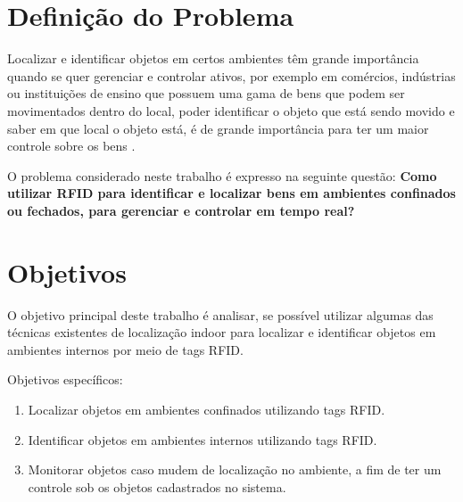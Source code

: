 \section{Definição do Problema}

Localizar e identificar objetos em certos ambientes têm grande importância quando se quer gerenciar e controlar ativos, por exemplo em comércios, indústrias ou instituições de ensino que possuem uma gama de bens que podem ser movimentados dentro do local,  poder identificar o objeto que está sendo movido e saber em que local o objeto está, é de grande importância para ter um maior controle sobre os bens \cite{realtimeRFID2016}. 

\par
O problema considerado neste trabalho é expresso na seguinte questão: \textbf{ Como utilizar RFID para identificar e localizar bens em ambientes confinados ou fechados, para gerenciar e controlar em tempo real?}
\section{Objetivos}
O objetivo principal deste trabalho é analisar, se possível utilizar algumas das técnicas existentes de localização indoor para localizar e identificar objetos em ambientes internos por meio de tags RFID.
\par
Objetivos específicos:
\begin{enumerate}

    \item Localizar objetos em ambientes confinados utilizando tags RFID.
    
    \item Identificar objetos em ambientes internos utilizando tags RFID.
    
    \item Monitorar objetos caso mudem de localização no ambiente, a fim de ter um controle sob os objetos cadastrados no sistema.
    
\end{enumerate}



